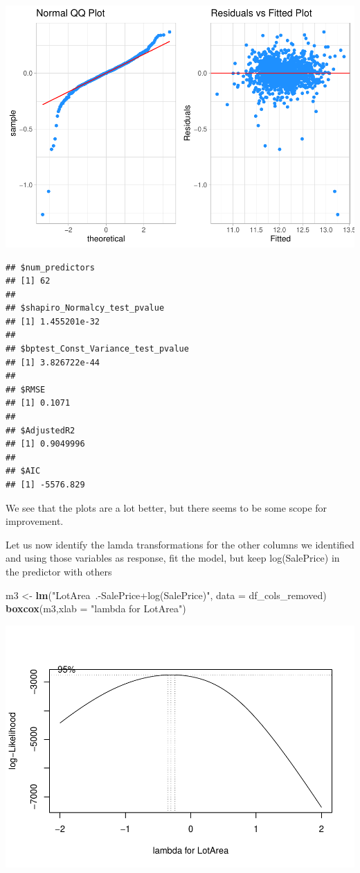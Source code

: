 \documentclass[
]{article}
\newenvironment{Shaded}{\begin{snugshade}}{\end{snugshade}}
\newcommand{\DataTypeTok}[1]{\textcolor[rgb]{0.13,0.29,0.53}{#1}}
\newcommand{\KeywordTok}[1]{\textcolor[rgb]{0.13,0.29,0.53}{\textbf{#1}}}
\newcommand{\NormalTok}[1]{#1}
\newcommand{\StringTok}[1]{\textcolor[rgb]{0.31,0.60,0.02}{#1}}
\begin{document}
\includegraphics{Final-Project_files/figure-latex/unnamed-chunk-17-1.pdf}

\begin{verbatim}
## $num_predictors
## [1] 62
## 
## $shapiro_Normalcy_test_pvalue
## [1] 1.455201e-32
## 
## $bptest_Const_Variance_test_pvalue
## [1] 3.826722e-44
## 
## $RMSE
## [1] 0.1071
## 
## $AdjustedR2
## [1] 0.9049996
## 
## $AIC
## [1] -5576.829
\end{verbatim}

We see that the plots are a lot better, but there seems to be some scope for improvement.

Let us now identify the lamda transformations for the other columns we identified and using those variables as response, fit the model, but keep log(SalePrice) in the predictor with others

\begin{Shaded}
\begin{Highlighting}[]
\NormalTok{m3 <-}\StringTok{ }\KeywordTok{lm}\NormalTok{(}\StringTok{"LotArea~.-SalePrice+log(SalePrice)"}\NormalTok{, }\DataTypeTok{data =}\NormalTok{ df_cols_removed)}
\KeywordTok{boxcox}\NormalTok{(m3,}\DataTypeTok{xlab =} \StringTok{"lambda for LotArea"}\NormalTok{)}
\end{Highlighting}
\end{Shaded}

\includegraphics{Final-Project_files/figure-latex/unnamed-chunk-18-1.pdf}
\end{document}
